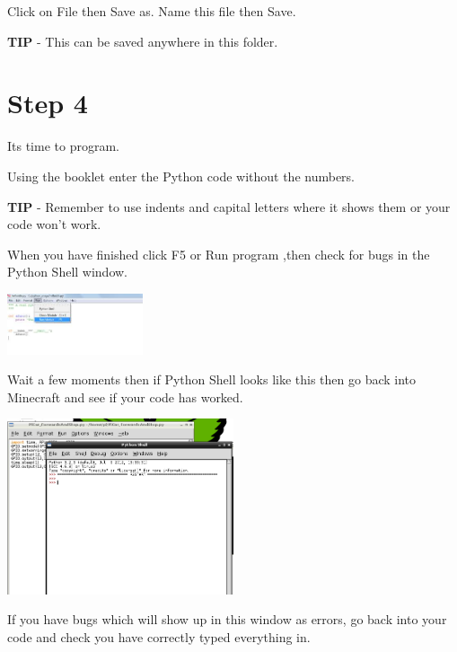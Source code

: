 \documentclass{geocraft-worksheet-multipage}
\begin{document}
Click on File then Save as. Name this file then Save.\vspace{0.5cm}

\textbf{TIP} - This can be saved anywhere in this folder.

\section*{Step 4}

Its time to program.\vspace{0.5cm}

Using the booklet enter the Python code without the numbers.\vspace{0.5cm}

\textbf{TIP} - Remember to use indents and capital letters where it
shows them or your code won’t work. \vspace{0.5cm}

When you have finished click F5 or Run program ,then check for bugs in
the Python Shell window.\vspace{0.5cm}

\includegraphics[width=0.3\textwidth]{pic6}\vspace{0.5cm}

Wait a few moments then if Python Shell looks like this then go back
into Minecraft and see if your code has worked. \vspace{0.5cm}


\includegraphics[width=0.5\textwidth]{pic7}\vspace{0.5cm}

If you have bugs which will show up in this window as errors, go back
into your code and check you have correctly typed everything
in. 
\end{document}
